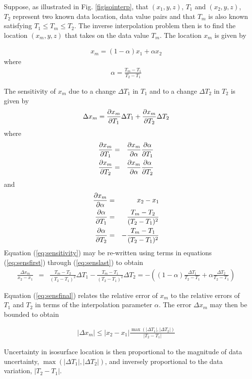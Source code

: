 \documentclass[11pt,twoside]{book}
\begin{document}
Suppose, as illustrated in Fig. \ref{figisointerp}, that $(x_1,y,z)$, $T_1$ and
$(x_2,y,z)$, $T_2$ represent two known data location, data value pairs and
that $T_m$ is also known satisfying $T_1\le T_m \le T_2$.  The inverse
interpolation problem then is to find the location $(x_m,y,z)$ that takes on
the data value $T_m$.  The location $x_m$ is given by

\begin{eqnarray}
x_m=(1-\alpha)x_1+\alpha x_2
\end{eqnarray}
where
\begin{eqnarray}
\alpha=\frac{T_m-T_1}{T_2-T_1}
\end{eqnarray}

\noindent The sensitivity of $x_m$ due to a change $\Delta T_1$ in $T_1$ and to a
change $\Delta T_2$ in $T_2$ is given by
\begin{eqnarray}
\Delta x_m= \frac{\partial x_m}{\partial T_1} \Delta T_1 + \frac{\partial x_m}{\partial T_2} \Delta T_2
\label{eq:sensitivity}
\end{eqnarray}
where
\begin{eqnarray}
\frac{\partial x_m}{\partial T_1}&=&\frac{\partial x_m}{\partial \alpha}\frac{\partial \alpha}{\partial T_1} \label{eq:sensfirst}\\
\frac{\partial x_m}{\partial T_2}&=&\frac{\partial x_m}{\partial \alpha}\frac{\partial \alpha}{\partial T_2}
\end{eqnarray}
and
\begin{eqnarray}
\frac{\partial x_m}{\partial \alpha}&=&x_2-x_1\\
\frac{\partial \alpha}{\partial T_1}&=&\frac{T_m-T_2}{(T_2-T_1)^2}\\
\frac{\partial \alpha}{\partial T_2}&=&-\frac{T_m-T_1}{(T_2-T_1)^2}
\label{eq:senslast}
\end{eqnarray}
Equation (\ref{eq:sensitivity}) may be re-written using terms in equations
(\ref{eq:sensfirst}) through (\ref{eq:senslast}) to obtain
\begin{eqnarray}
\frac{\Delta x_m}{x_2-x_1}&=&\frac{T_m-T_2}{(T_2-T_1)^2}\Delta T_1-
\frac{T_m-T_1}{(T_2-T_1)^2}\Delta T_2
=-\left(
(1-\alpha)\frac{\Delta T_1}{T_2-T_1}+
\alpha\frac{\Delta T_2}{T_2-T_1}\right)
\label{eq:sensfinal}
\end{eqnarray}

\noindent Equation (\ref{eq:sensfinal}) relates the relative error of $x_m$ to
the relative errors of $T_1$ and $T_2$ in terms of the interpolation parameter $\alpha$.
The error $\Delta x_m$ may then be bounded to obtain

\begin{eqnarray}
|\Delta x_m|\le
|x_2-x_1|\frac{\max(|\Delta T_1|,|\Delta T_2|)}{|T_2-T_1|}
\end{eqnarray}

\noindent Uncertainty in isosurface location is then proportional to the magnitude
of data uncertainty, $\max(|\Delta T_1|,|\Delta T_2|)$, and inversely proportional
to the data variation, $|T_2-T_1|$.
\end{document}
